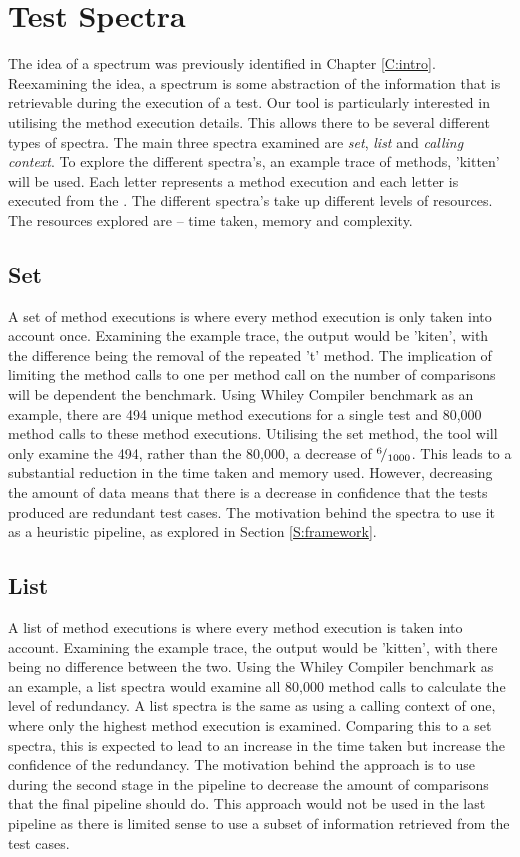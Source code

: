 \section{Test Spectra}
\label{S:spectra}
The idea of a spectrum was previously identified in Chapter \ref{C:intro}. Reexamining the idea, a spectrum is some abstraction of the information that is retrievable during the execution of a test. Our tool is particularly interested in utilising the method execution details. This allows there to be several different types of spectra. The main three spectra examined are \textit{set}, \textit{list} and \textit{calling context}. To explore the different spectra's, an example trace of methods, 'kitten' will be used. Each letter represents a method execution and each letter is executed from the . The different spectra's take up different levels of resources. The resources explored are -- time taken, memory and complexity. 

\subsection{Set}
A set of method executions is where every method execution is only taken into account once. Examining the example trace, the output would be 'kiten', with the difference being the removal of the repeated 't' method. The implication of limiting the method calls to one per method call on the number of comparisons will be dependent the benchmark. Using Whiley Compiler benchmark as an example, there are 494 unique method executions for a single test and 80,000 method calls to these method executions. Utilising the set method, the tool will only examine the 494, rather than the 80,000, a decrease of ${}^{6}\!/_{1000}$. This leads to a substantial reduction in the time taken and memory used. However, decreasing the amount of data means that there is a decrease in confidence that the tests produced are redundant test cases. The motivation behind the spectra to use it as a heuristic pipeline, as explored in Section \ref{S:framework}.

\subsection{List}
A list of method executions is where every method execution is taken into account. Examining the example trace, the output would be 'kitten', with there being no difference between the two. Using the Whiley Compiler benchmark as an example, a list spectra would examine all 80,000 method calls to calculate the level of redundancy. A list spectra is the same as using a calling context of one, where only the highest method execution is examined. Comparing this to a set spectra, this is expected to lead to an increase in the time taken but increase the confidence of the redundancy. The motivation behind the approach is to use during the second stage in the pipeline to decrease the amount of comparisons that the final pipeline should do. This approach would not be used in the last pipeline as there is limited sense to use a subset of information retrieved from the test cases.

